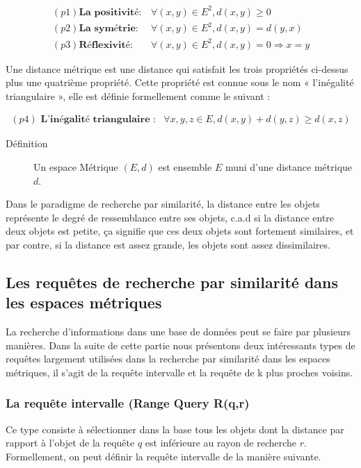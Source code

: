 \begin{equation}
	\begin{array}{cc}
	(p1) \textbf{La positivité} : & \forall (x,y)\in E^2, d(x,y) \ge 0 \\
	(p2) \textbf{La symétrie} : & \forall (x,y)\in E^2, d(x,y) = d(y,x) \\
	(p3) \textbf{Réflexivité} : & \forall (x,y)\in E^2, d(x,y) = 0 \Rightarrow x = y
	\end{array}
\end{equation}

Une distance métrique est une distance qui satisfait les trois propriétés ci-dessus plus une quatrième propriété. Cette propriété est connue sous le nom « l’inégalité triangulaire », elle est définie formellement comme le suivant :

\begin{equation}
\begin{array}{cc}
(p4)\textbf{ L’inégalité triangulaire :}  & \forall x,y,z\in E, d(x,y)+d(y,z) \geq d(x,z)
\end{array}
\end{equation}

\begin{description}
	\item[Définition] Un espace Métrique $ (E,d) $ est ensemble $ E $ muni d’une distance métrique $ d $.
\end{description}

Dans le paradigme de recherche par similarité, la distance entre les objets représente le degré de ressemblance entre ses objets, c.a.d si la distance entre deux objets est petite, ça signifie que ces deux objets sont fortement similaires, et par contre, si la distance est assez
grande, les objets sont assez dissimilaires.

\subsection{Les requêtes de recherche par similarité dans les espaces métriques}
La recherche d’informations dans une base de données peut se faire par plusieurs manières. Dans la suite de cette partie nous présentons deux intéressants types de requêtes largement utilisées dans la recherche par similarité dans les espaces métriques, il s’agit de la requête intervalle et la requête de k plus proches voisins.

\subsubsection{La requête intervalle (Range Query R(q,r)}
Ce type consiste à sélectionner dans la base tous les objets dont la
distance par rapport à l’objet de la requête $ q $ est inférieure au rayon de recherche $ r $. Formellement, on peut définir la requête intervalle de la manière suivante.

